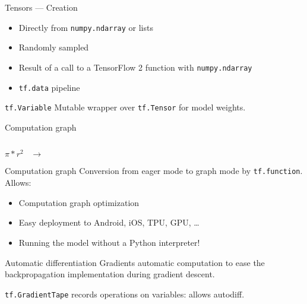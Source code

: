 \begin{frame}{Tensors --- Creation}
  \begin{itemize}[<+->]
    \item Directly from \texttt{numpy.ndarray} or lists
    \item Randomly sampled
    \item Result of a call to a TensorFlow 2 function with \texttt{numpy.ndarray}
    \item \texttt{tf.data} pipeline
  \end{itemize}
\end{frame}

\begin{frame}{\texttt{tf.Variable}}
  Mutable wrapper over \texttt{tf.Tensor} for model weights.
\end{frame}

\begin{frame}{Computation graph}
  \begin{minipage}[l]{0.15\linewidth}
      $\;$
  \end{minipage}\hfill
  \begin{minipage}[l]{0.35\linewidth}
    \huge
    \begin{center}
      $\pi*r^2\;\;\;\rightarrow$
    \end{center}
  \end{minipage}\hfill
  \begin{minipage}[l]{0.49\linewidth}
  \end{minipage}\hfill
\end{frame}

\begin{frame}{Computation graph}
  Conversion from eager mode to graph mode by \texttt{tf.function}. Allows:

  \begin{itemize}[<+->]
    \item Computation graph optimization
    \item Easy deployment to Android, iOS, TPU, GPU, …
    \item Running the model without a Python interpreter!
  \end{itemize}
\end{frame}

\begin{frame}{Automatic differentiation}
  Gradients automatic computation to ease the backpropagation implementation during gradient descent.

  \texttt{tf.GradientTape} records operations on variables: allows autodiff.
\end{frame}

